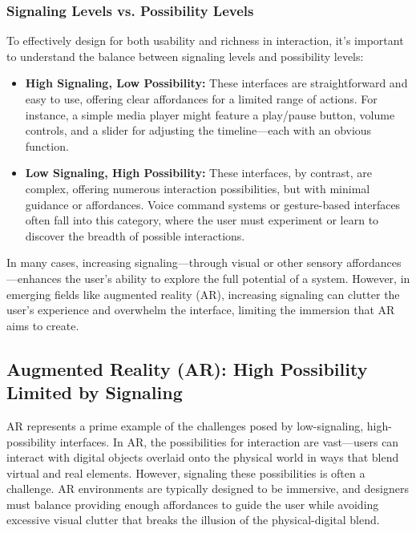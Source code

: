 \subsubsection{ Signaling Levels vs. Possibility Levels}

To effectively design for both usability and richness in interaction, it's important to understand the balance between signaling levels and possibility levels:

\begin{itemize}
    \item \textbf{High Signaling, Low Possibility:} These interfaces are straightforward and easy to use, offering clear affordances for a limited range of actions. For instance, a simple media player might feature a play/pause button, volume controls, and a slider for adjusting the timeline—each with an obvious function.
    \item \textbf{Low Signaling, High Possibility:} These interfaces, by contrast, are complex, offering numerous interaction possibilities, but with minimal guidance or affordances. Voice command systems or gesture-based interfaces often fall into this category, where the user must experiment or learn to discover the breadth of possible interactions.
\end{itemize}
    
    

In many cases, increasing signaling—through visual or other sensory affordances—enhances the user's ability to explore the full potential of a system.
 However, in emerging fields like augmented reality (AR), increasing signaling can clutter the user's experience and overwhelm the interface, limiting the immersion that AR aims to create.

\subsection{ Augmented Reality (AR): High Possibility Limited by Signaling}

AR represents a prime example of the challenges posed by low-signaling, high-possibility interfaces.
In AR, the possibilities for interaction are vast—users can interact with digital objects overlaid onto the physical world in ways that blend virtual and real elements.
However, signaling these possibilities is often a challenge. AR environments are typically designed to be immersive, and designers must balance providing enough affordances to guide the user while avoiding excessive visual clutter that breaks the illusion of the physical-digital blend.

